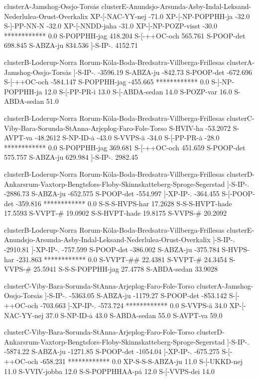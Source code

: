clusterA-Jamshog-Ossjo-Tors\.as
clusterE-Anundsjo-Arsunda-Asby-Indal-Leksand-Nederlulea-Orust-Overkalix
XP-[-NAC-YY-nej -71.0
XP-[-NP-POPPHH-ja -32.0
S-]-PP-NN-N -32.0
XP-[-NNDD-jaha -31.0
XP-]-NP-POZP-visst -30.0
************ 0.0
S-POPPHH-jag 418.204
S-[-++OC-och 565.761
S-POOP-det 698.845
S-ABZA-ju 834.536
]-S-IP-. 4152.71

clusterB-Loderup-Norra Rorum-K\"ola-Boda-Bredsatra-Villberga-Frillesas
clusterA-Jamshog-Ossjo-Tors\.as
]-S-IP-. -3596.19
S-ABZA-ju -842.73
S-POOP-det -672.696
S-[-++OC-och -584.147
S-POPPHH-jag -455.665
************ 0.0
S-]-NP-POPPHH-ja 12.0
S-[-PP-PR-i 13.0
S-[-ABDA-sedan 14.0
S-POZP-var 16.0
S-ABDA-sedan 51.0

clusterB-Loderup-Norra Rorum-K\"ola-Boda-Bredsatra-Villberga-Frillesas
clusterC-Viby-Bara-Sorunda-StAnna-Arjeplog-Faro-Fole-Torso
S-HVIV-ha -53.2072
S-AVPT-va -48.2612
S-NP-ID-\.a -43.0
S-VVPS-\"a -34.0
S-[-PP-PR-\.a -28.0
************ 0.0
S-POPPHH-jag 369.681
S-[-++OC-och 451.659
S-POOP-det 575.757
S-ABZA-ju 629.984
]-S-IP-. 2982.45

clusterB-Loderup-Norra Rorum-K\"ola-Boda-Bredsatra-Villberga-Frillesas
clusterD-Ankarsrum-Vaxtorp-Bengtsfors-Floby-Skinnskatteberg-Sproge-Segerstad
]-S-IP-. -2886.73
S-ABZA-ju -652.575
S-POOP-det -554.997
]-XP-IP-. -364.455
S-[-POOP-det -359.816
************ 0.0
S-S-S-HVPS-har 17.2628
S-S-S-HVPT-hade 17.5593
S-VVPT-\# 19.0902
S-S-HVPT-hade 19.8175
S-VVPS-\# 20.2092

clusterB-Loderup-Norra Rorum-K\"ola-Boda-Bredsatra-Villberga-Frillesas
clusterE-Anundsjo-Arsunda-Asby-Indal-Leksand-Nederlulea-Orust-Overkalix
]-S-IP-. -2910.81
]-XP-IP-. -757.599
S-POOP-det -386.002
S-ABZA-ju -375.784
S-HVPS-har -231.863
************ 0.0
S-VVPT-\#\# 22.4381
S-VVPT-\# 24.3454
S-VVPS-\# 25.5941
S-S-S-POPPHH-jag 27.4778
S-ABDA-sedan 33.9028

clusterC-Viby-Bara-Sorunda-StAnna-Arjeplog-Faro-Fole-Torso
clusterA-Jamshog-Ossjo-Tors\.as
]-S-IP-. -5363.05
S-ABZA-ju -1179.27
S-POOP-det -853.142
S-[-++OC-och -703.663
]-XP-IP-. -573.724
************ 0.0
S-VVPS-\"a 34.0
XP-[-NAC-YY-nej 37.0
S-NP-ID-\.a 43.0
S-ABDA-sedan 55.0
S-AVPT-va 59.0

clusterC-Viby-Bara-Sorunda-StAnna-Arjeplog-Faro-Fole-Torso
clusterD-Ankarsrum-Vaxtorp-Bengtsfors-Floby-Skinnskatteberg-Sproge-Segerstad
]-S-IP-. -5874.22
S-ABZA-ju -1271.85
S-POOP-det -1054.04
]-XP-IP-. -675.275
S-[-++OC-och -658.231
************ 0.0
XP-S-S-S-ABZA-ju 11.0
S-[-UKKD-nej 11.0
S-VVIV-jobba 12.0
S-S-POPPHHAA-p\.a 12.0
S-[-VVPS-dei 14.0

